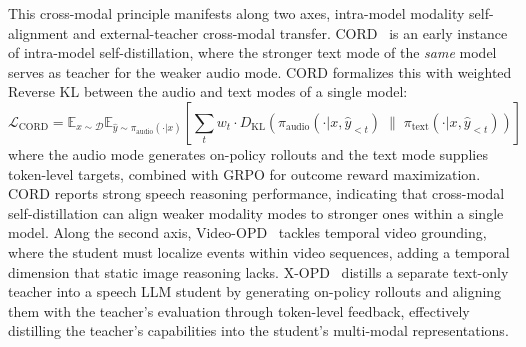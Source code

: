 \documentclass{article} %
\newcommand{\E}{\mathbb{E}}
\newcommand{\KL}{D_{\mathrm{KL}}}
\newcommand{\loss}{\mathcal{L}}
\begin{document}
This cross-modal principle manifests along two axes, intra-model modality self-alignment and external-teacher cross-modal transfer. CORD~\citep{2601.16547} is an early instance of intra-model self-distillation, where the stronger text mode of the \emph{same} model serves as teacher for the weaker audio mode. CORD formalizes this with weighted Reverse KL between the audio and text modes of a single model:
\begin{equation*}
    \loss_{\text{CORD}} = \E_{x \sim \mathcal{D}} \E_{\hat{y} \sim \pi_{\text{audio}}(\cdot|x)} \left[ \sum_{t} w_t \cdot \KL\!\left(\pi_{\text{audio}}(\cdot|x, \hat{y}_{<t}) \;\|\; \pi_{\text{text}}(\cdot|x, \hat{y}_{<t})\right) \right]
\end{equation*}
where the audio mode generates on-policy rollouts and the text mode supplies token-level targets, combined with GRPO for outcome reward maximization. CORD reports strong speech reasoning performance, indicating that cross-modal self-distillation can align weaker modality modes to stronger ones within a single model. Along the second axis, Video-OPD~\citep{2602.02994} tackles temporal video grounding, where the student must localize events within video sequences, adding a temporal dimension that static image reasoning lacks. X-OPD~\citep{2603.24596} distills a separate text-only teacher into a speech LLM student by generating on-policy rollouts and aligning them with the teacher's evaluation through token-level feedback, effectively distilling the teacher's capabilities into the student's multi-modal representations.
\end{document}
